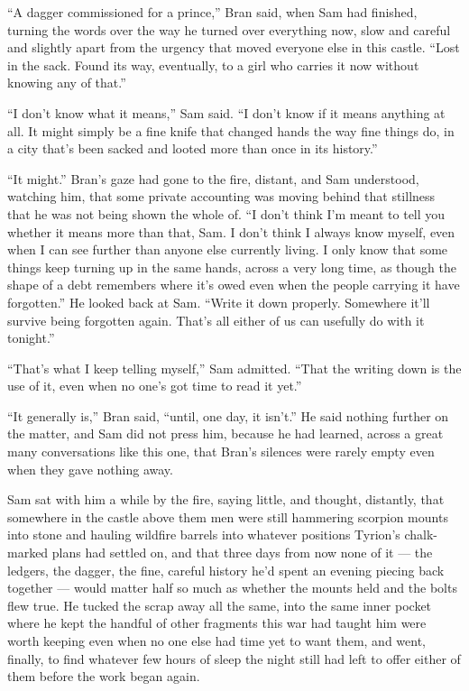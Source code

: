“A dagger commissioned for a prince,” Bran said, when Sam had finished, turning the words over the way he turned over everything now, slow and careful and slightly apart from the urgency that moved everyone else in this castle. “Lost in the sack. Found its way, eventually, to a girl who carries it now without knowing any of that.”

“I don’t know what it means,” Sam said. “I don’t know if it means anything at all. It might simply be a fine knife that changed hands the way fine things do, in a city that’s been sacked and looted more than once in its history.”

“It might.” Bran’s gaze had gone to the fire, distant, and Sam understood, watching him, that some private accounting was moving behind that stillness that he was not being shown the whole of. “I don’t think I’m meant to tell you whether it means more than that, Sam. I don’t think I always know myself, even when I can see further than anyone else currently living. I only know that some things keep turning up in the same hands, across a very long time, as though the shape of a debt remembers where it’s owed even when the people carrying it have forgotten.” He looked back at Sam. “Write it down properly. Somewhere it’ll survive being forgotten again. That’s all either of us can usefully do with it tonight.”

“That’s what I keep telling myself,” Sam admitted. “That the writing down is the use of it, even when no one’s got time to read it yet.”

“It generally is,” Bran said, “until, one day, it isn’t.” He said nothing further on the matter, and Sam did not press him, because he had learned, across a great many conversations like this one, that Bran’s silences were rarely empty even when they gave nothing away.

Sam sat with him a while by the fire, saying little, and thought, distantly, that somewhere in the castle above them men were still hammering scorpion mounts into stone and hauling wildfire barrels into whatever positions Tyrion’s chalk-marked plans had settled on, and that three days from now none of it — the ledgers, the dagger, the fine, careful history he’d spent an evening piecing back together — would matter half so much as whether the mounts held and the bolts flew true. He tucked the scrap away all the same, into the same inner pocket where he kept the handful of other fragments this war had taught him were worth keeping even when no one else had time yet to want them, and went, finally, to find whatever few hours of sleep the night still had left to offer either of them before the work began again.
